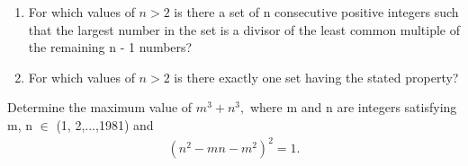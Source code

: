 
\item
\begin{enumerate}
\item For which values of $n > 2$ is there a set of n consecutive positive integers such that the largest number in the set is a divisor of the least common multiple of the remaining n - 1 numbers?
\item For which values of $n > 2$ is there exactly one set having the stated property?
\end{enumerate}

\item Determine the maximum value of $m^3 + n^3,$ where m and n are integers
satisfying m, n $\in$ (1, 2,...,1981) and 
\begin{align*}
(n^{2} - mn - m^{2})^2 = 1.
\end{align*}

